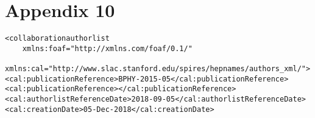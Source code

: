 \section*{Appendix 10}
\label{sec:app10}

\begin{lstlisting}
<collaborationauthorlist
    xmlns:foaf="http://xmlns.com/foaf/0.1/"
    xmlns:cal="http://www.slac.stanford.edu/spires/hepnames/authors_xml/">
<cal:publicationReference>BPHY-2015-05</cal:publicationReference>
<cal:publicationReference></cal:publicationReference>
<cal:authorlistReferenceDate>2018-09-05</cal:authorlistReferenceDate>
<cal:creationDate>05-Dec-2018</cal:creationDate>

\end{lstlisting}